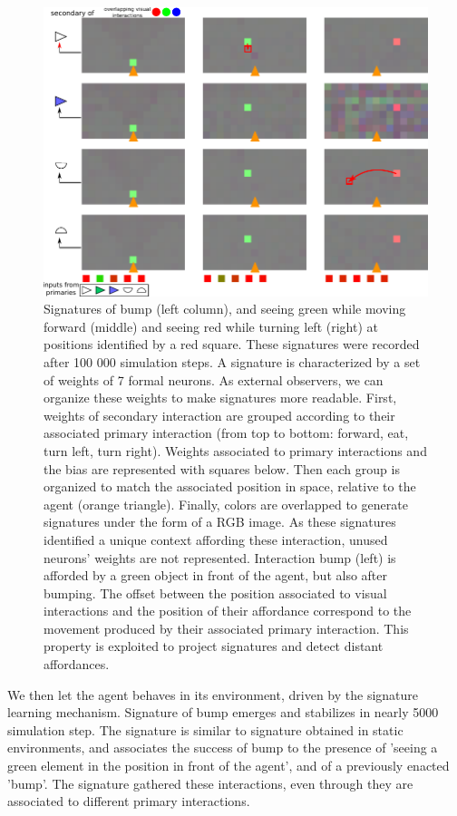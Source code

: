 \documentclass[conference]{IEEEtran}
\begin{document}
\begin{figure}[htbp]
\centerline{\includegraphics[scale=0.5]{img/Signatures1.pdf}}
\caption{Signatures of bump (left column), and seeing green while moving forward (middle) and seeing red while turning left (right) at positions identified by a red square. These signatures were recorded after 100 000 simulation steps. A signature is characterized by a set of weights of 7 formal neurons. As external observers, we can organize these weights to make signatures more readable. First, weights of secondary interaction are grouped according to their associated primary interaction (from top to bottom: forward, eat, turn left, turn right). Weights associated to primary interactions and the bias are represented with squares below. Then each group is organized to match the associated position in space, relative to the agent (orange triangle). Finally, colors are overlapped to generate signatures under the form of a RGB image. As these signatures identified a unique context affording these interaction, unused neurons' weights are not represented. Interaction bump (left) is afforded by a green object in front of the agent, but also after bumping. The offset between the position associated to visual interactions and the position of their affordance correspond to the movement produced by their associated primary interaction. This property is exploited to project signatures and detect distant affordances.}
\label{fig}
\end{figure}






We then let the agent behaves in its environment, driven by the signature learning mechanism. Signature of bump emerges and stabilizes in nearly 5000 simulation step. The signature is similar to signature obtained in static environments, and associates the success of bump to the presence of 'seeing a green element in the position in front of the agent', and of a previously enacted 'bump'. The signature gathered these interactions, even through they are associated to different primary interactions. %
\end{document}
